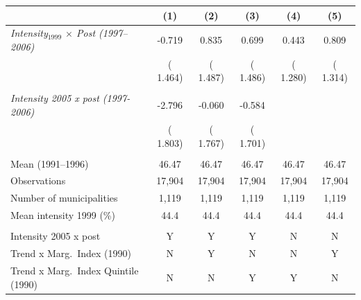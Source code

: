 \begin{tabular}{lccccc} \hline \hline
& \multicolumn{1}{c}{(1)} & \multicolumn{1}{c}{(2)} & \multicolumn{1}{c}{(3)} & \multicolumn{1}{c}{(4)} & \multicolumn{1}{c}{(5)} \\ \toprule
\textit{Intensity$_{1999}$ $\times$ Post (1997--2006)} &       -0.719 &        0.835 &        0.699 &        0.443 &        0.809 \\ 
 & (       1.464) & (       1.487) & (       1.486) & (       1.280) & (       1.314) \\ 
  & & & & & \\ 
\textit{Intensity 2005 x post (1997-2006)} &       -2.796 &       -0.060 &       -0.584 & & \\ 
 & (       1.803) & (       1.767) & (       1.701) & & \\ 
  & & & & & \\ 
Mean (1991--1996) &        46.47 &        46.47 &        46.47 &        46.47 &        46.47 \\ 
Observations &       17,904 &       17,904 &       17,904 &       17,904 &       17,904 \\ 
Number of municipalities &        1,119 &        1,119 &        1,119 &        1,119 &        1,119 \\ 
Mean intensity 1999 (\%) &   44.4 &   44.4 &   44.4 &   44.4 &   44.4 \\ 
  & & & & & \\ 
Intensity 2005 x post & Y & Y & Y & N & N \\ Trend x Marg.\ Index (1990) & N & Y & N & N & Y \\ Trend x Marg.\ Index Quintile (1990) & N & N & Y & Y & N \\ 
\bottomrule
\end{tabular}